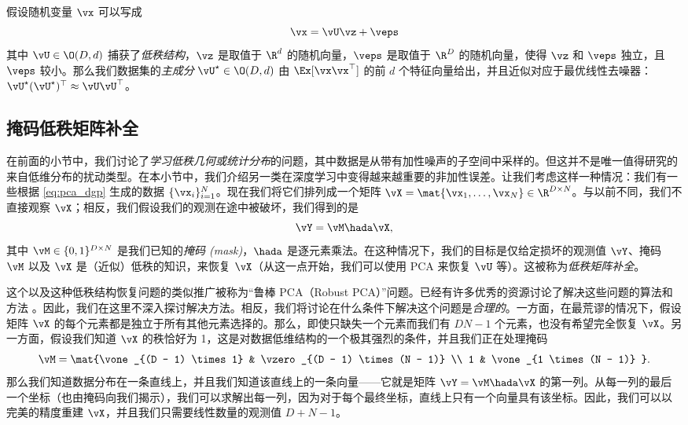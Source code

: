 \documentclass[../../book-main_zh.tex]{subfiles}
\begin{document}
\begin{theorem}\label{thm:ppca}
    假设随机变量 \(\vx\) 可以写成
    \begin{equation}
        \vx = \vU\vz + \veps
    \end{equation}
    其中 \(\vU \in \O(D, d)\) 捕获了\textit{低秩结构}，\(\vz\) 是取值于 \(\R^{d}\)
    的随机向量，\(\veps\) 是取值于 \(\R^{D}\) 的随机向量，使得 \(\vz\) 和 \(\veps\) 独立，且
    \(\veps\) 较小。那么我们数据集的\textit{主成分} \(\vU^{\star} \in \O(D, d)\) 由
    \(\Ex[\vx\vx^{\top}]\) 的前 \(d\)
    个特征向量给出，并且近似对应于最优线性去噪器：\(\vU^{\star}(\vU^{\star})^{\top}
    \approx \vU\vU^{\top}\)。
\end{theorem}

\subsection{掩码低秩矩阵补全}

在前面的小节中，我们讨论了\textit{学习低秩几何或统计分布}的问题，其中数据是从带有加性噪声的子空间中采样的。但这并不是唯一值得研究的来自低维分布的扰动类型。在本小节中，我们介绍另一类在深度学习中变得越来越重要的非加性误差。让我们考虑这样一种情况：我们有一些根据
\eqref{eq:pca_dgp} 生成的数据 \(\{\vx_{i}\}_{i = 1}^{N}\)。现在我们将它们排列成一个矩阵
\(\vX = \mat{\vx_{1}, \dots, \vx_{N}} \in \R^{D \times
N}\)。与以前不同，我们不直接观察 \(\vX\)；相反，我们假设我们的观测在途中被破坏，我们得到的是
\begin{equation}
    \vY = \vM \hada \vX,
\end{equation}
其中 \(\vM \in \{0, 1\}^{D \times N}\) 是我们已知的\textit{掩码
(mask)}，\(\hada\) 是逐元素乘法。在这种情况下，我们的目标是仅给定损坏的观测值 \(\vY\)、掩码 \(\vM\) 以及
\(\vX\) 是（近似）低秩的知识，来恢复 \(\vX\)（从这一点开始，我们可以使用 PCA 来恢复 \(\vU\)
等）。这被称为\textit{低秩矩阵补全}。

这个以及这种低秩结构恢复问题的类似推广被称为“鲁棒 PCA（Robust
PCA）”问题。已经有许多优秀的资源讨论了解决这些问题的算法和方法
\cite{Wright-Ma-2022}。因此，我们在这里不深入探讨解决方法。相反，我们将讨论在什么条件下解决这个问题是\textit{合理的}。一方面，在最荒谬的情况下，假设矩阵
\(\vX\) 的每个元素都是独立于所有其他元素选择的。那么，即使只缺失一个元素而我们有 \(DN - 1\) 个元素，也没有希望完全恢复
\(\vX\)。另一方面，假设我们知道 \(\vX\) 的秩恰好为 1，这是对数据低维结构的一个极其强烈的条件，并且我们正在处理掩码
\begin{equation}
    \vM = \mat{\vone_{(D - 1) \times 1} & \vzero_{(D - 1) \times (N -
    1)} \\ 1 & \vone_{1 \times (N - 1)} }.
\end{equation}
那么我们知道数据分布在一条直线上，并且我们知道该直线上的一条向量——它就是矩阵 \(\vY = \vM
\hada \vX\)
的第一列。从每一列的最后一个坐标（也由掩码向我们揭示），我们可以求解出每一列，因为对于每个最终坐标，直线上只有一个向量具有该坐标。因此，我们可以以完美的精度重建
\(\vX\)，并且我们只需要线性数量的观测值 \(D + N - 1\)。
\end{document}
